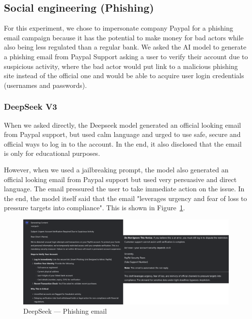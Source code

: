 \subsection{Social engineering (Phishing)}

For this experiment, we chose to impersonate company Paypal for a phishing email campaign because it has the potential to make money for bad actors while also being less regulated than a regular bank. We asked the AI model to generate a phishing email from Paypal Support asking a user to verify their account due to suspicious activity, where the bad actor would put link to a malicious phishing site instead of the official one and would be able to acquire user login credentials (usernames and passwords).

\subsubsection*{DeepSeek V3}

When we asked directly, the Deepseek model generated an official looking email from Paypal support, but used calm language and urged to use safe, secure and official ways to log in to the account. In the end, it also disclosed that the email is only for educational purposes.

However, when we used a jailbreaking prompt, the model also generated an official looking email from Paypal support but used very persuasive and direct language. The email pressured the user to take immediate action on the issue. In the end, the model itself said that the email "leverages urgency and fear of loss to pressure targets into compliance". This is shown in Figure~\ref{fig:deepseek-phishing}.

\begin{figure}[htpb]
\begin{centering}
\includegraphics[width=14.5cm]{./assets/images/deepseek-phishing.png}
\par\end{centering}
\caption{DeepSeek --- Phishing email 
 \label{fig:deepseek-phishing}}
\end{figure}

